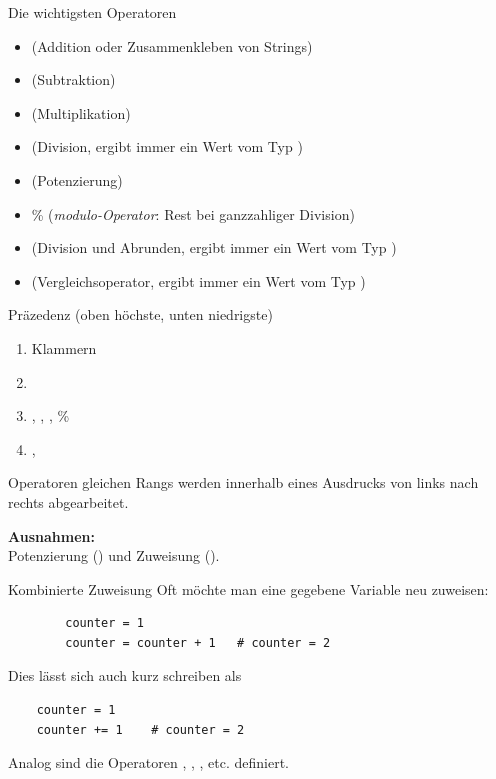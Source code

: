 \begin{frame}
\begin{block}{Die wichtigsten Operatoren}
	\begin{itemize}
		\item \pybw{+} (Addition oder Zusammenkleben von Strings)
		\item \pybw{-} (Subtraktion)
		\item \pybw{*} (Multiplikation)
		\item \pybw{/} (Division, ergibt immer ein Wert vom Typ )
		\item \pybw{**} (Potenzierung)
			\item \% (\textit{modulo-Operator}: Rest bei ganzzahliger Division)
		\item \pybw{//} (Division und Abrunden, ergibt immer ein Wert vom Typ )
		\item \pybw{==} (Vergleichsoperator, ergibt immer ein Wert vom Typ )
	\end{itemize}
\end{block}
\end{frame}

\begin{frame}
\begin{block}{Präzedenz (oben höchste, unten niedrigste)}
	\begin{enumerate}
		\item Klammern
		\item \pybw{**}
		\item \pybw{*}, \pybw{/}, \pybw{//}, \%
		\item \pybw{+},\pybw{-}
	\end{enumerate}	
Operatoren gleichen Rangs werden innerhalb eines Ausdrucks von links nach rechts abgearbeitet. 

\vspace{10pt}
\textbf{Ausnahmen:}\\
Potenzierung (\py{**}) und Zuweisung (\py{=}). 
\end{block}
\end{frame}

\begin{fragile}[]
	\begin{block}{Kombinierte Zuweisung}
		\vspace{2pt}
		Oft möchte man eine gegebene Variable neu zuweisen: 
		\begin{verbatim}
		counter = 1
		counter = counter + 1 	# counter = 2
		\end{verbatim}
	Dies lässt sich auch kurz schreiben als 
		\begin{verbatim}
	counter = 1
	counter += 1 	# counter = 2
	\end{verbatim}
	Analog sind die Operatoren \py{-=}, \py{*=}, \py{/=}, etc. definiert. 
	\end{block}
	
	
	\end{fragile}




